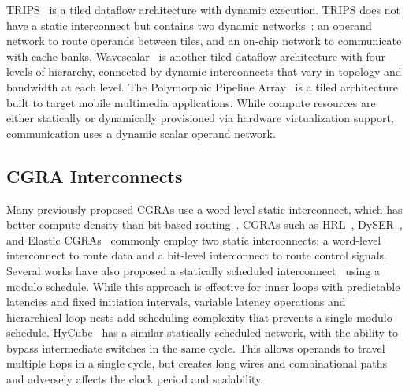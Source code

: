TRIPS~\cite{trips} is a tiled dataflow architecture with dynamic execution. TRIPS does not have a static interconnect but contains two dynamic networks~\cite{trips-network}: an operand network to route operands between tiles, and an on-chip network to communicate with cache banks. Wavescalar~\cite{wavescalar} is another tiled dataflow architecture with four levels of hierarchy, connected by dynamic interconnects that vary in topology and bandwidth at each level. The Polymorphic Pipeline Array~\cite{ppa} is a tiled architecture built to target mobile multimedia applications. While compute resources are either statically or dynamically provisioned via hardware virtualization support, communication uses a dynamic scalar operand network.

\subsection{CGRA Interconnects}
Many previously proposed CGRAs use a word-level static interconnect, which has better compute density than bit-based routing~\cite{bus-fpga}. CGRAs such as HRL~\cite{hrl}, DySER~\cite{dyser}, and Elastic CGRAs~\cite{elasticCGRAs} commonly employ two static interconnects: a word-level interconnect to route data and a bit-level interconnect to route control signals.
Several works have also proposed a statically scheduled interconnect~\cite{van2009static, dimitroulakos2006exploring, wave} using a modulo schedule. While this approach is effective for inner loops with predictable latencies and fixed initiation intervals, variable latency operations and hierarchical loop nests add scheduling complexity that prevents a single modulo schedule. HyCube~\cite{hycube} has a similar statically scheduled network, with the ability to bypass intermediate switches in the same cycle. This allows operands to travel multiple hops in a single cycle, but creates long wires and combinational paths and adversely affects the clock period and scalability.
